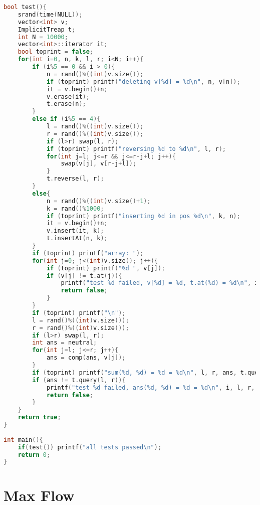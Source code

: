 \documentclass[12pt,a4paper,twoside]{report}
\begin{document}
\begin{lstlisting}[caption=Implicit Treap,language=C++]
bool test(){
    srand(time(NULL));
    vector<int> v;
    ImplicitTreap t;
    int N = 10000;
    vector<int>::iterator it;
    bool toprint = false;
    for(int i=0, n, k, l, r; i<N; i++){
        if (i%5 == 0 && i > 0){
            n = rand()%((int)v.size());
            if (toprint) printf("deleting v[%d] = %d\n", n, v[n]);
            it = v.begin()+n;
            v.erase(it);
            t.erase(n);
        }
        else if (i%5 == 4){
            l = rand()%((int)v.size());
            r = rand()%((int)v.size());
            if (l>r) swap(l, r);
            if (toprint) printf("reversing %d to %d\n", l, r);
            for(int j=l; j<=r && j<=r-j+l; j++){
                swap(v[j], v[r-j+l]);
            }
            t.reverse(l, r);
        }
        else{
            n = rand()%((int)v.size()+1);
            k = rand()%1000;
            if (toprint) printf("inserting %d in pos %d\n", k, n);
            it = v.begin()+n;
            v.insert(it, k);
            t.insertAt(n, k);
        }
        if (toprint) printf("array: ");
        for(int j=0; j<(int)v.size(); j++){
            if (toprint) printf("%d ", v[j]);
            if (v[j] != t.at(j)){
                printf("test %d failed, v[%d] = %d, t.at(%d) = %d\n", i+1, j, v[j], j, t.at(j));
                return false;
            }
        }
        if (toprint) printf("\n");
        l = rand()%((int)v.size());
        r = rand()%((int)v.size());
        if (l>r) swap(l, r);
        int ans = neutral;
        for(int j=l; j<=r; j++){
            ans = comp(ans, v[j]);
        }
        if (toprint) printf("sum(%d, %d) = %d = %d\n", l, r, ans, t.query(l, r));
        if (ans != t.query(l, r)){
            printf("test %d failed, ans(%d, %d) = %d = %d\n", i, l, r, ans, t.query(l, r));
            return false;
        }
    }
    return true;
}
 
int main(){
    if(test()) printf("all tests passed\n");
    return 0;
}
\end{lstlisting}

\chapter{Max Flow}
\end{document}
